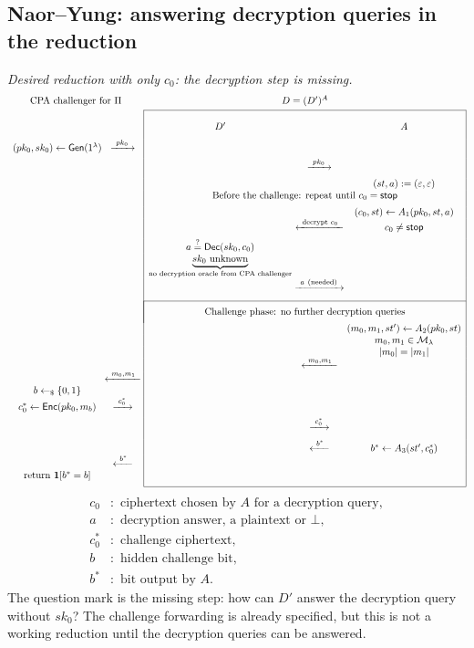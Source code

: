 \documentclass[12pt,a4paper]{article}
\begin{document}
\subsection*{Naor--Yung: answering decryption queries in the reduction}
\textit{Desired reduction with only $c_0$: the decryption step is missing.}
\begingroup\footnotesize
\[
\begin{array}{c@{\;}c@{\;}|c@{\;}c@{\;}c|}
\multicolumn{2}{c}{\text{CPA challenger for }\Pi}&
\multicolumn{3}{c}{D=(D')^A}\\[3pt]
\cline{3-5}
&&\rule{0pt}{20pt}D'&&A\\[6pt]
(pk_0,sk_0)\leftarrow\mathsf{Gen}(1^\lambda)
&\xrightarrow{\ pk_0\ }&&&\\[4pt]
&&&\xrightarrow{\ pk_0\ }&\\[5pt]
&&&&(st,a):=(\varepsilon,\varepsilon)\\
&&\multicolumn{3}{c|}{\text{Before the challenge: repeat until }c_0=\mathsf{stop}}\\[5pt]
&&&&(c_0,st)\leftarrow A_1(pk_0,st,a)\\
&&&\xleftarrow{\ \text{decrypt }c_0\ }&c_0\ne\mathsf{stop}\\[5pt]
&&a\overset{?}{=}\mathsf{Dec}(sk_0,c_0)&&\\
&&\underbrace{sk_0\text{ unknown}}_{\text{no decryption oracle from CPA challenger}}&&\\[5pt]
&&&\xrightarrow{\ a\ \text{(needed)}\ }&\\[7pt]
\cline{3-5}
&&\multicolumn{3}{|c|}{\rule{0pt}{14pt}\text{Challenge phase: no further decryption queries}}\\[5pt]
&&&&(m_0,m_1,st')\leftarrow A_2(pk_0,st)\\
&&&&m_0,m_1\in\mathcal M_\lambda\\
&&&&|m_0|=|m_1|\\
&&&\xleftarrow{\ m_0,m_1\ }&\\
&\xleftarrow{\ m_0,m_1\ }&&&\\
b\leftarrow_{\$}\{0,1\}&&&&\\
c_0^*\leftarrow\mathsf{Enc}(pk_0,m_b)
&\xrightarrow{\ c_0^*\ }&&&\\[4pt]
&&&\xrightarrow{\ c_0^*\ }&\\[6pt]
&&&\xleftarrow{\ b^*\ }&b^*\leftarrow A_3(st',c_0^*)\\
&\xleftarrow{\ b^*\ }&&&\\
\mathrm{return}\ \mathbf1[b^*=b]&&&&\\[5pt]
\cline{3-5}
\end{array}
\]
\endgroup
\[
\begin{aligned}
c_0&:\text{ ciphertext chosen by }A\text{ for a decryption query},\\
a&:\text{ decryption answer, a plaintext or }\bot,\\
c_0^*&:\text{ challenge ciphertext},\\
b&:\text{ hidden challenge bit},\\
b^*&:\text{ bit output by }A.
\end{aligned}
\]
The question mark is the missing step: how can $D'$ answer the
decryption query without $sk_0$? The challenge forwarding is already
specified, but this is not a working reduction until the decryption
queries can be answered.
\end{document}
